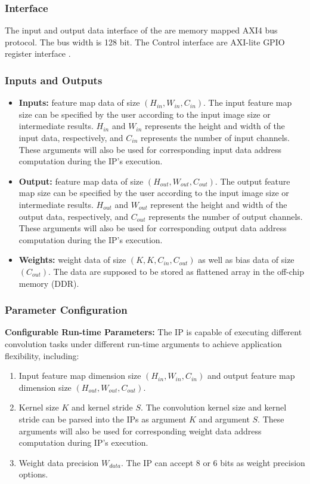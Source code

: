 \documentclass[a4paper, 11pt]{article}
\begin{document}
\subsubsection{Interface}
The input and output data interface of the are memory mapped AXI4 bus protocol. The bus width is 128 bit. The Control interface are AXI-lite GPIO register interface .



\subsubsection{Inputs and Outputs}

\begin{itemize}
\item {
\textbf{Inputs:} feature map data of size $(H_{in}, W_{in}, C_{in})$.
The input feature map size can be specified by the user according to the input image size or intermediate results. $H_{in}$ and $W_{in}$ represents the height and width of the input data, respectively, and $C_{in}$ represents the number of input channels. These arguments will also be used for corresponding input data address computation during the IP's execution.
}
\item {
\textbf{Output:} feature map data of size $(H_{out}, W_{out}, C_{out})$.
The output feature map size can be specified by the user according to the input image size or intermediate results. $H_{out}$ and $W_{out}$ represent the height and width of the output data, respectively, and $C_{out}$ represents the number of output channels. These arguments will also be used for corresponding output data address computation during the IP's execution.
}
\item {
\textbf{Weights:} weight data of size $(K, K, C_{in}, C_{out})$ as well as bias data of size $( C_{out})$. The data are supposed to be stored as flattened array in the off-chip memory (DDR).
}
\end{itemize}


\subsubsection{Parameter Configuration}


\quad
\textbf{Configurable Run-time Parameters:}
The IP is capable of executing different convolution tasks under different run-time arguments to achieve application flexibility, including:

\begin{enumerate}
    \item {
    Input feature map dimension size $(H_{in}, W_{in}, C_{in})$ and
    output feature map dimension size $(H_{out}, W_{out}, C_{out})$.
    }
    
    \item {
    Kernel size $K$ and kernel stride $S$. The convolution kernel size and kernel stride can be parsed into the IPs as argument $K$ and argument $S$. These arguments will also be used for corresponding weight data address computation during IP's execution.
    }
    \item {
    Weight data precision $W_{data}$.
    The IP can accept 8 or 6 bits as weight precision options.  
    }
\end{enumerate}
    
\end{document}
